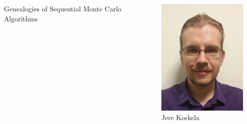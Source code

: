 \documentclass[aspectratio=169]{beamer}
\begin{document}
\begin{frame}
\begin{columns}
\begin{column}{0.4\textwidth}
{\LARGE Genealogies of Sequential Monte Carlo Algorithms}
\end{column}
\begin{column}{0.2\textwidth}
\centering
\includegraphics[width=\textwidth]{jere.jpg}\\
Jere Koskela
\end{column}
\begin{column}{0.2\textwidth}
\centering

\end{column}
\end{columns}
\end{frame}
\end{document}
